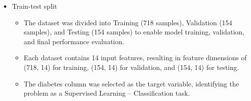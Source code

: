 \documentclass[12pt,a4paper]{article}
\begin{document}
\begin{itemize}
\begin{itemize}
\end{itemize}
\item Train-test split
\begin{itemize}
\item The dataset was divided into Training (718 samples), Validation (154 samples), and Testing (154 samples) to enable model training, validation, and final performance evaluation.
\item Each dataset contains 14 input features, resulting in feature dimensions of (718, 14) for training, (154, 14) for validation, and (154, 14) for testing.
\item The diabetes column was selected as the target variable, identifying the problem as a Supervised Learning – Classification task.
\end{itemize}
\end{itemize}
\end{document}
